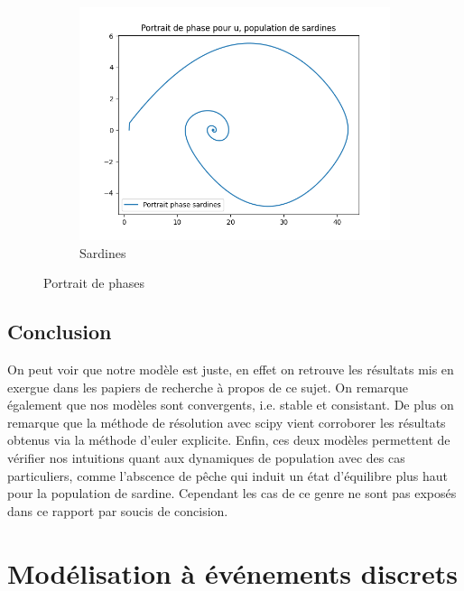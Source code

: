 \documentclass[a4paper, 11pt]{report}%
\begin{document}
\begin{figure}[!h]
\begin{subfigure}[b]{.3\textwidth}
        		\centering
       			\includegraphics[width=\textwidth]{figures/Portrait_de_phase_sardine.png}
            	\caption{Sardines}
    		\end{subfigure}
    		\caption{Portrait de phases}
		\end{figure}


        \subsection{Conclusion}
        On peut voir que notre modèle est juste, en effet on retrouve les résultats mis en exergue 
        dans les papiers de recherche à propos de ce sujet.\cite{} On remarque également que nos modèles
        sont convergents, i.e. stable et consistant. De plus on remarque que la méthode de résolution avec
        scipy vient corroborer les résultats obtenus via la méthode d'euler explicite. Enfin, ces deux modèles
        permettent de vérifier nos intuitions quant aux dynamiques de population avec des cas particuliers,
        comme l'abscence de pêche qui induit un état d'équilibre plus haut pour la population de sardine. 
        Cependant les cas de ce genre ne sont pas exposés dans ce rapport par soucis de concision. 

    \section{Modélisation à événements discrets}
\end{document}
